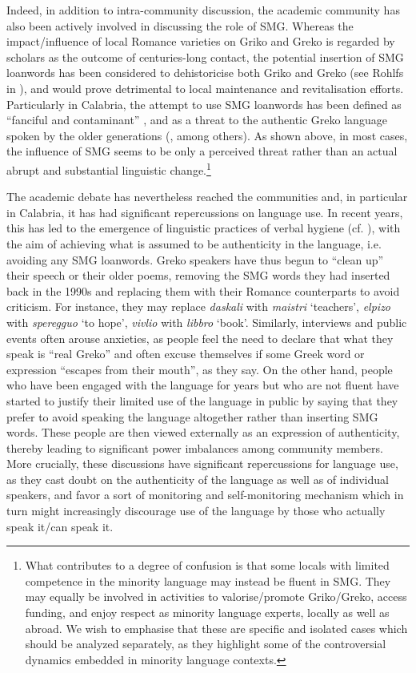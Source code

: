 \documentclass[output=paper,hidelinks]{langscibook}
\begin{document}
Indeed, in addition to intra-community discussion, the academic community has also been actively involved in discussing the role of SMG. Whereas the impact/influence of local Romance varieties on Griko and Greko is regarded by scholars as the outcome of centuries-long contact, the potential insertion of SMG loanwords has been considered to dehistoricise both Griko and Greko (see Rohlfs in \citealt{Petropoulou1992, Karanastasis1984}), and would prove detrimental to local maintenance and revitalisation efforts. Particularly in Calabria, the attempt to use SMG loanwords has been defined as “fanciful and contaminant” \citep[263]{Martino2009}, and as a threat to the authentic Greko language spoken by the older generations (\citealt{Karanastasis1984, Katsoyannou2017}, among others). As shown above, in most cases, the influence of SMG seems to be only a perceived threat rather than an actual abrupt and substantial linguistic change.\footnote{What contributes to a degree of confusion is that some locals with limited competence in the minority language may instead be fluent in SMG. They may equally be involved in activities to valorise/promote Griko/Greko, access funding, and enjoy respect as minority language experts, locally as well as abroad. We wish to emphasise that these are specific and isolated cases which should be analyzed separately, as they highlight some of the controversial dynamics embedded in minority language contexts.} 



The academic debate has nevertheless reached the communities and, in particular in Calabria, it has had significant repercussions on language use. In recent years, this has led to the emergence of linguistic practices of verbal hygiene (cf. \citealt{Pellegrino2021}), with the aim of achieving what is assumed to be authenticity in the language, i.e. avoiding any SMG loanwords. Greko speakers have thus begun to ``clean up'' their speech or their older poems, removing the SMG words they had inserted back in the 1990s and replacing them with their Romance counterparts to avoid criticism. For instance, they may replace \textit{daskali} with \textit{maistri} ‘teachers’, \textit{elpizo} with \textit{speregguo} ‘to hope’, \textit{vivlio} with \textit{libbro} ‘book’. Similarly, interviews and public events often arouse anxieties, as people feel the need to declare that what they speak is ``real Greko'' and often excuse themselves if some Greek word or expression ``escapes from their mouth'', as they say. On the other hand, people who have been engaged with the language for years but who are not fluent have started to justify their limited use of the language in public by saying that they prefer to avoid speaking the language altogether rather than inserting SMG words. These people are then viewed externally as an expression of authenticity, thereby leading to significant power imbalances among community members. More crucially, these discussions have significant repercussions for language use, as they cast doubt on the authenticity of the language as well as of individual speakers, and favor a sort of monitoring and self-monitoring mechanism which in turn might increasingly discourage use of the language by those who actually speak it/can speak it.
\end{document}
